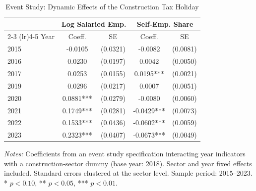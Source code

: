 \begin{table}[htbp]
\centering
\caption{Event Study: Dynamic Effects of the Construction Tax Holiday}
\label{tab:eventstudy}
\begin{threeparttable}
\begin{tabular}{lcccc}
\toprule
 & \multicolumn{2}{c}{Log Salaried Emp.} & \multicolumn{2}{c}{Self-Emp. Share} \\
\cmidrule(lr){2-3} \cmidrule(lr){4-5}
Year & Coeff. & SE & Coeff. & SE \\
\midrule
2015 & -0.0105 & (0.0321) & -0.0082 & (0.0081) \\
2016 & 0.0230 & (0.0197) & 0.0042 & (0.0050) \\
2017 & 0.0253 & (0.0155) & 0.0195*** & (0.0021) \\
2019 & 0.0296 & (0.0217) & 0.0007 & (0.0051) \\
2020 & 0.0881*** & (0.0279) & -0.0080 & (0.0060) \\
2021 & 0.1749*** & (0.0281) & -0.0429*** & (0.0073) \\
2022 & 0.1533*** & (0.0436) & -0.0602*** & (0.0059) \\
2023 & 0.2323*** & (0.0407) & -0.0673*** & (0.0049) \\
\bottomrule
\end{tabular}
\begin{tablenotes}[flushleft]
\small
\item \textit{Notes:} Coefficients from an event study specification interacting year indicators with a construction-sector dummy (base year: 2018). Sector and year fixed effects included. Standard errors clustered at the sector level. Sample period: 2015--2023. * $p < 0.10$, ** $p < 0.05$, *** $p < 0.01$.
\end{tablenotes}
\end{threeparttable}
\end{table}
